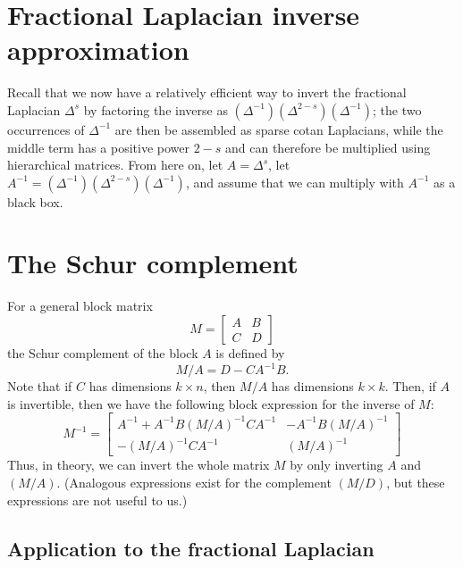 \documentclass[11pt]{article}
\begin{document}

\thispagestyle{empty}

\section{Fractional Laplacian inverse approximation}
\label{sec:FractionalLaplacianInverseApproximation}

Recall that we now have a relatively efficient way to invert the fractional Laplacian $\Delta^{s}$ by factoring the inverse as $(\Delta^{-1}) (\Delta^{2 - s}) (\Delta^{-1})$; the two occurrences of $\Delta^{-1}$ are then be assembled as sparse cotan Laplacians, while the middle term has a positive power $2-s$ and can therefore be multiplied using hierarchical matrices. From here on, let $A = \Delta^{s}$, let $A^{-1} = (\Delta^{-1}) (\Delta^{2 - s}) (\Delta^{-1})$, and assume that we can multiply with $A^{-1}$ as a black box.

\section{The Schur complement}

For a general block matrix
$$M = 
\left[
\begin{array}{cc}
A & B \\
C & D
\end{array}
\right]
$$
the Schur complement of the block $A$ is defined by $$M / A = D - C A^{-1} B.$$ Note that if $C$ has dimensions $k \times n$, then $M / A$ has dimensions $k \times k$. Then, if $A$ is invertible, then we have the following block expression for the inverse of $M$:
$$
M^{-1} = \left[
\begin{array}{cc}
A^{-1} + A^{-1} B (M / A)^{-1} C A^{-1} & -A^{-1} B (M / A)^{-1} \\
-(M / A)^{-1} C A^{-1} & (M / A)^{-1}
\end{array}
\right]
$$
Thus, in theory, we can invert the whole matrix $M$ by only inverting $A$ and $(M/A)$. (Analogous expressions exist for the complement $(M/D)$, but these expressions are not useful to us.)

\subsection{Application to the fractional Laplacian}
\end{document}
